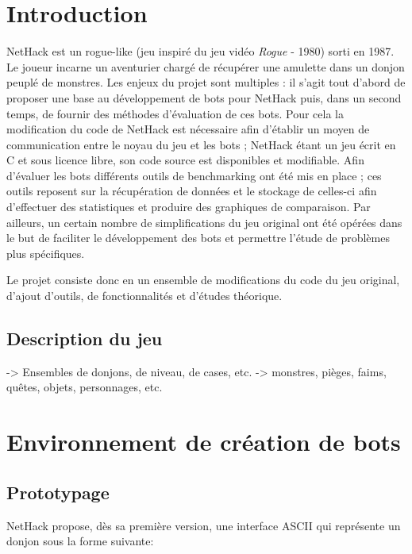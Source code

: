 \documentclass[a4paper,11pt]{article}
\begin{document}
\tableofcontents
\pagebreak

\section{Introduction}

NetHack est un rogue-like (jeu inspiré du jeu vidéo \emph{Rogue} - 1980)
sorti en 1987. Le joueur incarne un aventurier chargé de récupérer une
amulette dans un donjon peuplé de monstres.
Les enjeux du projet sont multiples : il s'agit tout d'abord de proposer une
base au développement de bots pour NetHack puis, dans un second temps, de
fournir des méthodes d'évaluation de ces bots. Pour cela la modification du code
de NetHack est nécessaire afin d'établir un moyen de communication entre le
noyau du jeu et les bots ; NetHack étant un jeu écrit en C et sous licence
libre, son code source est disponibles et modifiable. Afin d'évaluer les bots
différents outils de benchmarking ont été mis en place ; ces outils reposent
sur la récupération de données et le stockage de celles-ci afin d'effectuer
des statistiques et produire des graphiques de comparaison.
Par ailleurs, un certain nombre de simplifications du jeu original ont été
opérées dans le but de faciliter le développement des bots et permettre
l'étude de problèmes plus spécifiques.  

Le projet consiste donc en un ensemble de modifications du code du jeu
original, d'ajout d'outils, de fonctionnalités et d'études théorique.

\subsection*{Description du jeu}
-> Ensembles de donjons, de niveau, de cases, etc.
-> monstres, pièges, faims, quêtes, objets, personnages, etc.

\section{Environnement de création de bots}

\subsection{Prototypage}

NetHack propose, dès sa première version, une interface ASCII qui représente un donjon sous la forme suivante:
\end{document}
